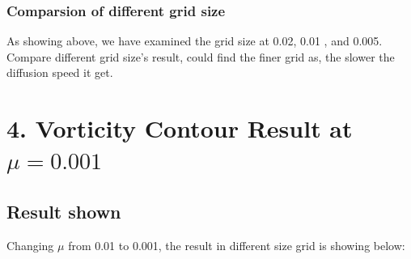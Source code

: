 \documentclass[12pt]{article}
\begin{document}
\subsubsection{Comparsion of different grid size}
As showing above, we have examined the grid size at 0.02, 0.01
, and 0.005. Compare different grid size's result, could find the finer grid
as, the slower the diffusion speed it get.






\newpage
\section{4.  Vorticity Contour Result at $\mu = 0.001$}

\subsection{Result shown}
Changing $\mu$ from 0.01 to 0.001, the result in different size
grid is showing below:
\end{document}
